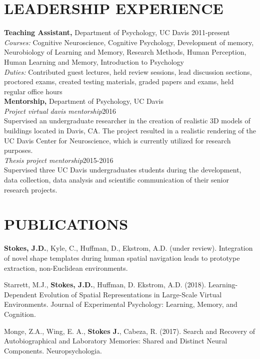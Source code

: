 \documentclass[line,margin,10pt]{res}
\begin{document}
\begin{resume}
\section{LEADERSHIP EXPERIENCE}
 \textbf{Teaching Assistant,} Department of Psychology, UC Davis \hfill 2011-present \\
\emph{Courses:} Cognitive Neuroscience, Cognitive Psychology, Development of memory, Neurobiology of Learning and Memory, Research Methods, Human Perception, Human Learning and Memory, Introduction to Psychology\\
\emph{Duties:} Contributed guest lectures, held review sessions, lead discussion sections, proctored exams, created testing materials, graded papers and exams, held regular office hours\\
\textbf{Mentorship,} Department of Psychology, UC Davis \\
\emph{Project virtual davis mentorship}\hfill 2016 \\
Supervised an undergraduate researcher in the creation of realistic 3D models of buildings located in Davis, CA. The project resulted in a realistic rendering of the UC Davis Center for Neuroscience, which is currently utilized for research purposes.\\
\emph{Thesis project mentorship}\hfill 2015-2016 \\
Supervised three UC Davis undergraduates students during the development, data collection, data analysis and scientific communication of their senior research projects.\\


\section{PUBLICATIONS}

\textbf{Stokes, J.D.}, Kyle, C., Huffman, D., Ekstrom, A.D. (under review). Integration of novel shape templates during human spatial navigation leads to prototype extraction, non-Euclidean environments.

Starrett, M.J., \textbf{Stokes, J.D.}, Huffman, D. Ekstrom, A.D. (2018). Learning-Dependent Evolution of Spatial Representations in Large-Scale Virtual Environments. Journal of Experimental Psychology: Learning, Memory, and Cognition.

Monge, Z.A., Wing, E. A., \textbf{Stokes J.}, Cabeza, R. (2017). Search and Recovery of Autobiographical and Laboratory Memories: Shared and Distinct Neural Components. Neuropsychologia.


\end{resume}
\end{document}
